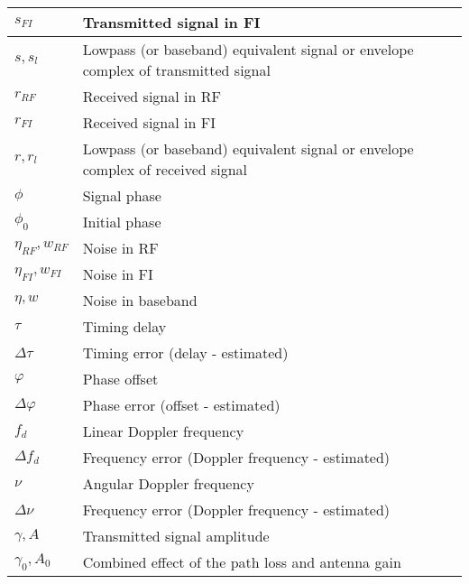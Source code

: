 \documentclass{article}
\begin{document}
\begin{xltabular}{\textwidth}{XX}
	\(s_{FI}\)            & Transmitted signal in FI                                                          \\ \hline
	\(s, s_l\)            & Lowpass (or baseband) equivalent signal or envelope complex of transmitted signal \\ \hline
	\(r_{RF}\)            & Received signal in RF                                                             \\ \hline
	\(r_{FI}\)            & Received signal in FI                                                             \\ \hline
	\(r, r_l\)            & Lowpass (or baseband) equivalent signal or envelope complex of received signal    \\ \hline
	\(\phi\)              & Signal phase                                                                      \\ \hline
	\(\phi_0\)            & Initial phase                                                                     \\ \hline
	\(\eta_{RF}, w_{RF}\) & Noise in RF                                                                       \\ \hline
	\(\eta_{FI}, w_{FI}\) & Noise in FI                                                                       \\ \hline
	\(\eta, w\)           & Noise in baseband                                                                 \\ \hline
	\(\tau\)              & Timing delay                                                                      \\ \hline
	\(\Delta\tau\)        & Timing error (delay - estimated)                                                  \\ \hline
	\(\varphi\)           & Phase offset                                                                      \\ \hline
	\(\Delta\varphi\)     & Phase error (offset - estimated)                                                  \\ \hline
	\(f_d\)               & Linear Doppler frequency                                                          \\ \hline
	\(\Delta f_d\)        & Frequency error (Doppler frequency - estimated)                                   \\ \hline
	\(\nu\)               & Angular Doppler frequency                                                         \\ \hline
	\(\Delta \nu\)        & Frequency error (Doppler frequency - estimated)                                   \\ \hline
	\(\gamma, A\)         & Transmitted signal amplitude                                                      \\ \hline
	\(\gamma_0, A_0\)     & Combined effect of the path loss and antenna gain
\end{xltabular}
\end{document}
